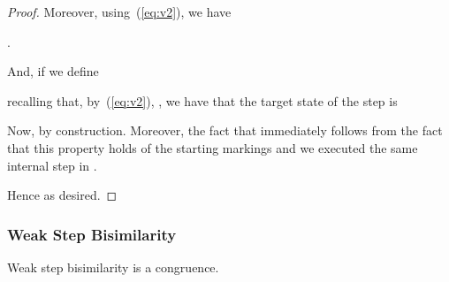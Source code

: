 \documentclass{LMCS}
\begin{document}
\begin{proof}
\noindent
  Moreover, using~(\ref{eq:v2}), we have 
  \begin{center}
    .
  \end{center}
  And, if we define
  \begin{center}
     
  \end{center}
  recalling that, by~(\ref{eq:v2}), ,
  we have that the target state of the step is
  \begin{center}
    
  \end{center}
  
  Now,  by construction. Moreover, the
  fact that  immediately follows from
  the fact that this property holds of the starting markings and we executed
  the same internal step in .

  Hence  as desired.
\end{proof}


\subsubsection{Weak Step Bisimilarity}

\begin{thm}
  \label{th:congruence-weak-step}
  Weak step bisimilarity is a congruence.
\end{thm}
\end{document}
